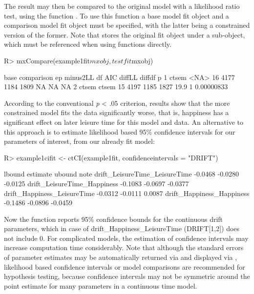 \documentclass[nojss]{jss}\usepackage[]{graphicx}\usepackage[]{color}
\begin{document}
The result may then be compared to the original model with a likelihood ratio test, using the  function . To use this function a base model fit object and a comparison model fit object must be specified, with the latter being a constrained version of the former. Note that  stores the original  fit object under a  sub-object, which must be referenced when using  functions directly.
\begin{Schunk}
\begin{Sinput}
R> mxCompare(example1fit$mxobj, testfit$mxobj)
\end{Sinput}
\begin{Soutput}
   base comparison ep minus2LL   df  AIC diffLL diffdf          p
1 ctsem       <NA> 16     4177 1184 1809     NA     NA         NA
2 ctsem      ctsem 15     4197 1185 1827   19.9      1 0.00000833
\end{Soutput}
\end{Schunk}
According to the conventional \textit{p} < .05 criterion, results show that the more constrained model fits the data significantly worse, that is, happiness has a significant effect on later leisure time for this model and data. 
An alternative to this approach is to estimate likelihood based 95\% confidence intervals for our parameters of interest, from our already fit model:

\begin{Schunk}
\begin{Sinput}
R> example1cifit <- ctCI(example1fit, confidenceintervals = "DRIFT")
\end{Sinput}
\begin{Soutput}
                               lbound estimate  ubound note
drift_LeisureTime_LeisureTime -0.0468  -0.0280 -0.0125     
drift_LeisureTime_Happiness   -0.1083  -0.0697 -0.0377     
drift_Happiness_LeisureTime   -0.0312  -0.0111  0.0087     
drift_Happiness_Happiness     -0.1486  -0.0896 -0.0459     
\end{Soutput}
\end{Schunk}

Now the  function reports 95\% confidence bounds for the continuous drift parameters, which in case of drift\_Happiness\_LeisureTime (DRIFT[1,2]) does not include 0. For complicated models, the estimation of confidence intervals may increase computation time considerably.  Note that although the standard errors of parameter estimates may be automatically returned via  and displayed via , likelihood based confidence intervals or model comparisons are recommended for hypothesis testing, because confidence intervals may not be symmetric around the point estimate for many parameters in a continuous time model.
\end{document}
